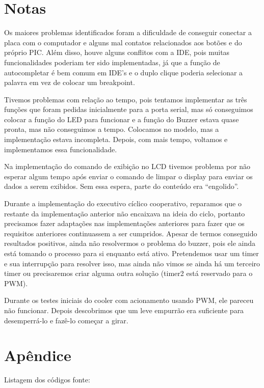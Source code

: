\documentclass{article}
\begin{document}
\section{Notas}
Os maiores problemas identificados foram a dificuldade de conseguir conectar a placa com o computador e alguns mal contatos relacionados aos botões e do próprio PIC. Além disso, houve alguns conflitos com a IDE, pois muitas funcionalidades poderiam ter sido implementadas, já que a função de autocompletar é bem comum em IDE's e o duplo clique poderia selecionar a palavra em vez de colocar um breakpoint.

Tivemos problemas com relação ao tempo, pois tentamos implementar as três funções que foram pedidas inicialmente para a porta serial, mas só conseguimos colocar a função do LED para funcionar e a função do Buzzer estava quase pronta, mas não conseguimos a tempo. Colocamos no modelo, mas a implementação estava incompleta. Depois, com mais tempo, voltamos e implementamos essa funcionalidade.

Na implementação do comando de exibição no LCD tivemos problema por não esperar algum tempo após enviar o comando de limpar o display para enviar os dados a serem exibidos. Sem essa espera, parte do conteúdo era ``engolido''.

Durante a implementação do executivo cíclico cooperativo, reparamos que o restante da implementação anterior não encaixava na ideia do ciclo, portanto precisamos fazer adaptações nas implementações anteriores para fazer que os requisitos anteriores continuassem a ser cumpridos. Apesar de termos conseguido resultados positivos, ainda não resolvermos o problema do buzzer, pois ele ainda está tomando o processo para si enquanto está ativo. Pretendemos usar um timer e sua interrupção para resolver isso, mas ainda não vimos se ainda há um terceiro timer ou precisaremos criar alguma outra solução (timer2 está reservado para o PWM).

Durante os testes iniciais do cooler com acionamento usando PWM, ele pareceu não funcionar. Depois descobrimos que um leve empurrão era suficiente para desemperrá-lo e fazê-lo começar a girar.

\begin{thebibliography}{widestlabel}

\end{thebibliography}

\section{Apêndice}
Listagem dos códigos fonte:
%
\end{document}
